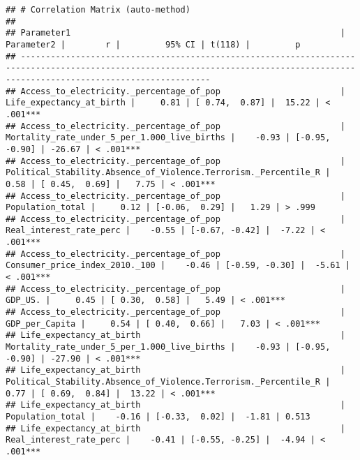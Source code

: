 \documentclass[
]{article}
\begin{document}
\begin{verbatim}
## # Correlation Matrix (auto-method)
## 
## Parameter1                                                      |                                                      Parameter2 |        r |         95% CI | t(118) |         p
## ----------------------------------------------------------------------------------------------------------------------------------------------------------------------------------
## Access_to_electricity._percentage_of_pop                        |                                        Life_expectancy_at_birth |     0.81 | [ 0.74,  0.87] |  15.22 | < .001***
## Access_to_electricity._percentage_of_pop                        |                    Mortality_rate_under_5_per_1.000_live_births |    -0.93 | [-0.95, -0.90] | -26.67 | < .001***
## Access_to_electricity._percentage_of_pop                        | Political_Stability.Absence_of_Violence.Terrorism._Percentile_R |     0.58 | [ 0.45,  0.69] |   7.75 | < .001***
## Access_to_electricity._percentage_of_pop                        |                                                Population_total |     0.12 | [-0.06,  0.29] |   1.29 | > .999   
## Access_to_electricity._percentage_of_pop                        |                                         Real_interest_rate_perc |    -0.55 | [-0.67, -0.42] |  -7.22 | < .001***
## Access_to_electricity._percentage_of_pop                        |                                  Consumer_price_index_2010._100 |    -0.46 | [-0.59, -0.30] |  -5.61 | < .001***
## Access_to_electricity._percentage_of_pop                        |                                                         GDP_US. |     0.45 | [ 0.30,  0.58] |   5.49 | < .001***
## Access_to_electricity._percentage_of_pop                        |                                                  GDP_per_Capita |     0.54 | [ 0.40,  0.66] |   7.03 | < .001***
## Life_expectancy_at_birth                                        |                    Mortality_rate_under_5_per_1.000_live_births |    -0.93 | [-0.95, -0.90] | -27.90 | < .001***
## Life_expectancy_at_birth                                        | Political_Stability.Absence_of_Violence.Terrorism._Percentile_R |     0.77 | [ 0.69,  0.84] |  13.22 | < .001***
## Life_expectancy_at_birth                                        |                                                Population_total |    -0.16 | [-0.33,  0.02] |  -1.81 | 0.513    
## Life_expectancy_at_birth                                        |                                         Real_interest_rate_perc |    -0.41 | [-0.55, -0.25] |  -4.94 | < .001***

\end{verbatim}
\end{document}
